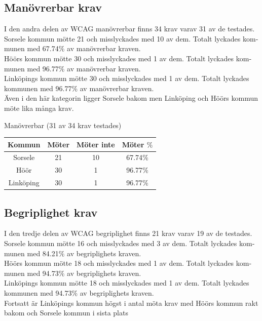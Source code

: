 \documentclass[11p]{article}
\begin{document}
\begin{otherlanguage}{swedish}
    \subsection{Manövrerbar krav}
    I den andra delen av WCAG manövrerbar finns 34 krav varav 31 av de testades.
    Sorsele kommun mötte 21 och misslyckades med 10 av dem.
    Totalt lyckades kommunen med 67.74$\%$ av manövrerbar kraven.
    \\Höörs kommun mötte 30 och misslyckades med 1 av dem.
    Totalt lyckades kommunen med 96.77$\%$ av manövrerbar kraven.
    \\Linköpings kommun mötte 30 och misslyckades med 1 av dem.
    Totalt lyckades kommunen med 96.77$\%$ av manövrerbar kraven.
    \\Även i den här kategorin ligger Sorsele bakom men Linköping och Höörs kommun möte lika många krav.

    \begin{center}
    Manövrerbar (31 av 34 krav testades)

    \begin{tabular}{ |c|c|c|c|}
        \hline
        Kommun & Möter & Möter inte & Möter $\%$ \\  \hline
        Sorsele & 21 & 10 & 67.74$\%$ \\ \hline
        Höör & 30 & 1 & 96.77$\%$ \\ \hline
        Linköping & 30 & 1 & 96.77$\%$ \\ \hline
    \end{tabular}
    \end{center}

    \subsection{Begriplighet krav}
    I den tredje delen av WCAG begriplighet finns 21 krav varav 19 av de testades.
    Sorsele kommun mötte 16 och misslyckades med 3 av dem.
    Totalt lyckades kommunen med 84.21$\%$ av begriplighets kraven.
    \\Höörs kommun mötte 18 och misslyckades med 1 av dem.
    Totalt lyckades kommunen med 94.73$\%$ av begriplighets kraven.
    \\Linköpings kommun mötte 18 och misslyckades med 1 av dem.
    Totalt lyckades kommunen med 94.73$\%$ av begriplighets kraven.
    \\Fortsatt är Linköpings kommun högst i antal möta krav med Höörs kommun rakt bakom och Sorsele kommun i sista plats


\end{otherlanguage}
\end{document}
